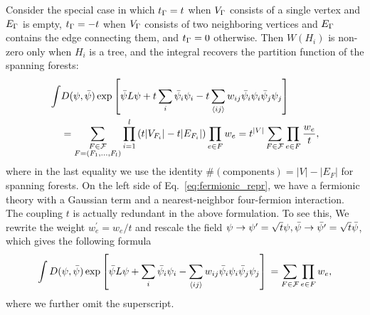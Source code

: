 Consider the special case in which $t_{{\Gamma}} = t$ when $V_{{\Gamma}}$ consists of a single vertex and $E_{{\Gamma}}$ is empty, $t_{{\Gamma}} = -t$ when $V_{\Gamma}$
consists of two neighboring vertices and $E_{{\Gamma}}$ contains the edge connecting them, and $t_{{\Gamma}} = 0$ otherwise. Then $W(H_i)$ is non-zero only when
$H_i$ is a tree, and the integral recovers the partition function of the spanning forests:
\begin{equation}\label{eq:fermionic_repr}
	\begin{aligned}
	\int &D(\psi, \bar{\psi}) \exp \left[\bar{\psi} L \psi+t \sum_{i} \bar{\psi}_{i} \psi_{i} -t \sum_{\langle i j\rangle} w_{i j} \bar{\psi}_{i} \psi_{i} \bar{\psi}_{j} \psi_{j}\right]\\
	 &= \sum_{\substack{F \in {\mathcal F} \\ F = (F_1, \dots, F_l)}} \prod_{i=1}^l\left(t|V_{F_i}| - t|E_{F_i}|\right) \prod_{e\in F} w_e 
	 = t^{|V|} \sum_{F\in {\mathcal F}}  \prod_{e\in F} \frac{w_e}{t},
	\end{aligned}
\end{equation}
where in the last equality we use the identity $\#(\text{components}) = |V| - |E_{F}|$ for spanning forests. On the left side of Eq.~\eqref{eq:fermionic_repr}, 
we have a fermionic theory with a Gaussian term and a nearest-neighbor four-fermion interaction. The coupling $t$ is actually redundant in the above formulation. To see this, 
We rewrite the weight $w_e^\prime = w_e/t$ and rescale the field ${\psi} \to {\psi}^\prime =\sqrt{t} {\psi}, \bar{{\psi}} \to \bar{{\psi}^\prime} = \sqrt{t}\bar{{\psi}}$, which
gives the following formula
\begin{equation}
	\int D(\psi, \bar{\psi}) \exp \left[\bar{\psi} L \psi+ \sum_{i} \bar{\psi}_{i} \psi_{i} - \sum_{\langle i j\rangle} w_{i j} \bar{\psi}_{i} \psi_{i} \bar{\psi}_{j} \psi_{j}\right]\\
	 = \sum_{F\in {\mathcal F}}  \prod_{e\in F} w_e,
\end{equation}
where we further omit the superscript.


